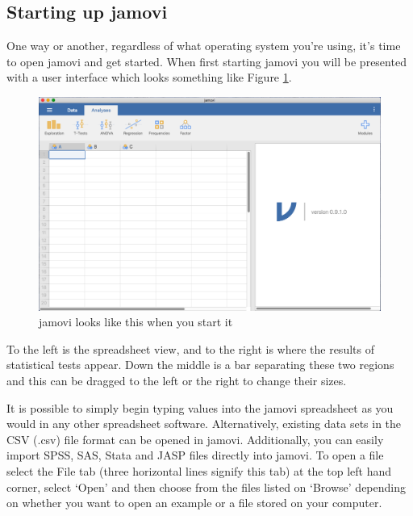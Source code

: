 \documentclass[
]{book}
\begin{document}
\hypertarget{starting-up-jamovi}{%
\subsection{Starting up jamovi}\label{starting-up-jamovi}}

One way or another, regardless of what operating system you're using, it's time to open
jamovi and get started. When first starting jamovi you will be presented with a user interface
which looks something like Figure \ref{fig:startingjamovi}.

\begin{figure}

{\centering \includegraphics[width=17.81in]{img/introj/startingjamovi} 

}

\caption{jamovi looks like this when you start it}\label{fig:startingjamovi}
\end{figure}

To the left is the spreadsheet view, and to the right is where the results of statistical tests appear. Down the middle is a bar separating these two regions and this can be dragged to the left or the right to change their sizes.

It is possible to simply begin typing values into the jamovi spreadsheet as you would in any other spreadsheet software. Alternatively, existing data sets in the CSV (.csv) file format can be opened in jamovi. Additionally, you can easily import SPSS, SAS, Stata and JASP files directly into jamovi. To open a file select the File tab (three horizontal lines signify this tab) at the top left hand corner, select `Open' and then choose from the files listed on `Browse' depending on whether you want to open an example or a file stored on your computer.
\end{document}
